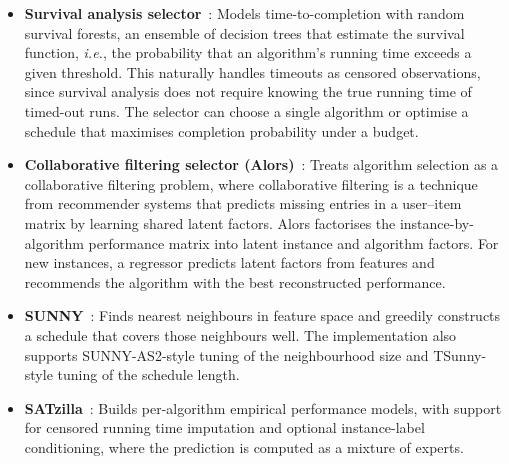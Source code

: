 \begin{itemize}
    \item \textbf{Survival analysis selector}~\citep{TorEtAl20,MarEtAl25}: Models time-to-completion with random survival forests, an ensemble of decision trees that estimate the survival function, \emph{i.e.}, the probability that an algorithm's running time exceeds a given threshold. This naturally handles timeouts as censored observations, since survival analysis does not require knowing the true running time of timed-out runs. The selector can choose a single algorithm or optimise a schedule that maximises completion probability under a budget.
    \item \textbf{Collaborative filtering selector (Alors)}~\citep{MisSeb17}: Treats algorithm selection as a collaborative filtering problem, where collaborative filtering is a technique from recommender systems that predicts missing entries in a user--item matrix by learning shared latent factors. Alors factorises the instance-by-algorithm performance matrix into latent instance and algorithm factors. For new instances, a regressor predicts latent factors from features and recommends the algorithm with the best reconstructed performance.
    \item \textbf{SUNNY}~\citep{AmaEtAl14,LiuEtAl21}: Finds nearest neighbours in feature space and greedily constructs a schedule that covers those neighbours well. The implementation also supports SUNNY-AS2-style tuning of the neighbourhood size and TSunny-style tuning of the schedule length.
    \item \textbf{SATzilla}~\citep{XuEtAl08}: Builds per-algorithm empirical performance models, with support for censored running time imputation and optional instance-label conditioning, where the prediction is computed as a mixture of experts.


\end{itemize}
